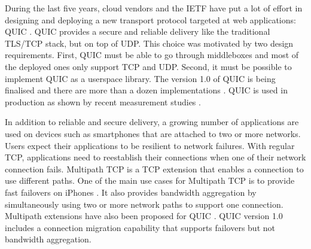 During the last five years, cloud vendors and the IETF have put a lot
of effort in designing and deploying a new transport protocol targeted
at web applications: QUIC \cite{10.1145/3098822.3098842}. QUIC
provides a secure and reliable delivery like the traditional TLS/TCP
stack, but on top of UDP. This choice was motivated by two design
requirements. First, QUIC must be able to go through middleboxes and most
of the deployed ones only support TCP and UDP. Second, it must be
possible to implement QUIC as a userspace library. The version 1.0 of
QUIC is being finalised \cite{draft-ietf-quic-transport} and there are
more than a dozen implementations \cite{quicimplem,marx2020same}. QUIC is used in
production as shown by recent measurement studies \cite{trevisan2020five}.  



In addition to reliable and secure delivery, a growing number of
applications are used on devices such as smartphones that are attached
to two or more networks. Users expect their applications to be
resilient to network failures. With regular TCP, applications need to
reestablish their connections when one of their network connection
fails. Multipath TCP \cite{rfc8684,raiciu2012hard} is a TCP extension
that enables a connection to use different paths. One of the main use
cases for Multipath TCP is to provide fast failovers on iPhones
\cite{bonaventure2016multipath}. It also provides bandwidth
aggregation by simultaneously using two or more network paths to
support one connection. Multipath extensions have also been proposed
for QUIC \cite{viernickel2018multipath,de2017multipath}. QUIC version
1.0 \cite{draft-ietf-quic-transport} includes a connection migration
capability that supports failovers but not bandwidth aggregation.









